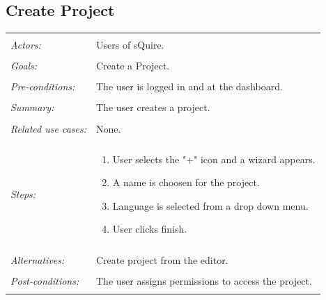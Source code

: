 \documentclass[11pt]{report}
\begin{document}
\subsection{Create Project}
\begin{tabular}{ p{2cm} p{12cm} }
 \hline
 \\
 \textit{Actors:} & Users of sQuire. \\ 
 \\
 \textit{Goals:} & Create a Project. \\
 \\
 \textit{Pre-conditions:} & The user is logged in and at the dashboard. \\
 \\
 \textit{Summary:} & The user creates a project. \\ 
 \\
 \textit{Related use cases:} & None. \\ 
 \\
 \textit{Steps:} & \begin{enumerate}
  \item User selects the "+" icon and a wizard appears.
  \item A name is choosen for the project.
  \item Language is selected from a drop down menu.
  \item User clicks finish.
 \end{enumerate} \\
 \\
 \textit{Alternatives:} & Create project from the editor. \\
 \\
 \textit{Post-conditions:} & The user assigns permissions to access the project. \\
 \\
\hline
\end{tabular}
\end{document}
